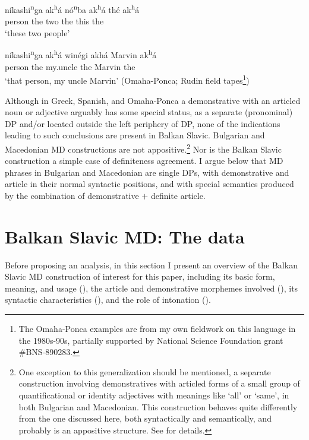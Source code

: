\documentclass[output=paper,
colorlinks,
citecolor=brown,
newtxmath
]{langscibook}
\begin{document}
\ex \label{akha2}
\gll níkashi\textsuperscript{n}ga ak\textsuperscript{h}á nó\textsuperscript{n}ba ak\textsuperscript{h}á  thé ak\textsuperscript{h}á \\
    person the two the this the \\
\glt `these two people'

\ex \label{akha3}
\gll níkashi\textsuperscript{n}ga ak\textsuperscript{h}á winégi akhá Marvin ak\textsuperscript{h}á \\
    person the my.uncle the Marvin the \\
\glt `that person, my uncle Marvin' \hfill (Omaha-Ponca; Rudin field tapes\footnote{The Omaha-Ponca examples are from my own fieldwork on this language in the 1980s-90s, partially supported by National Science Foundation grant \#BNS-890283.})
\z
\z

\noindent Although in Greek, Spanish, and Omaha-Ponca a demonstrative with an articled noun or adjective arguably has some special status, as a separate (pronominal) DP and/or located outside the left periphery of DP, none of the indications leading to such conclusions are present in Balkan Slavic. Bulgarian and Macedonian MD constructions are not appositive.\footnote{\label{qtype}One exception to this generalization should be mentioned, a separate construction involving demonstratives with articled forms of a small group of quantificational or identity adjectives with  meanings like `all' or `same', in both Bulgarian and Macedonian. This construction behaves quite differently from the one discussed here, both syntactically and semantically, and probably is an appositive structure. See \cite{Rudin2018} for details.}\label{Qtype} Nor is the Balkan Slavic construction a simple case of definiteness agreement. I argue below that MD phrases in Bulgarian and Macedonian are single DPs, with demonstrative and article in their normal syntactic positions, and with special semantics produced by the combination of demonstrative $+$ definite article.
\section{Balkan Slavic MD: The data}
Before proposing an analysis, in this section I present an overview of the Balkan Slavic MD construction of interest for this paper, including its basic form, meaning, and usage (), the article and demonstrative morphemes involved (), its syntactic characteristics (), and the role of intonation ().
\end{document}
